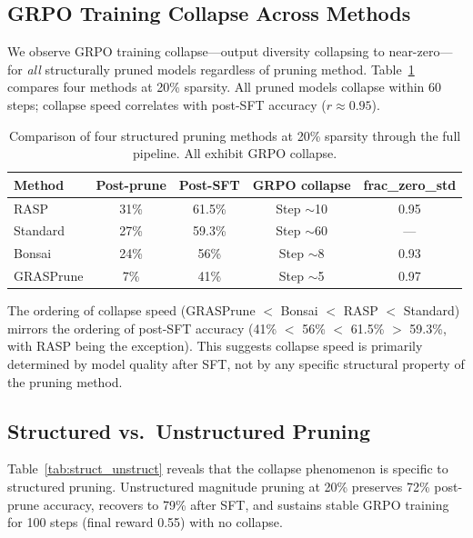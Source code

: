 \documentclass[11pt,a4paper]{article}
\begin{document}
\subsection{GRPO Training Collapse Across Methods}
\label{sec:collapse}

We observe GRPO training collapse---output diversity collapsing to near-zero---for \emph{all} structurally pruned models regardless of pruning method. Table~\ref{tab:methods} compares four methods at 20\% sparsity. All pruned models collapse within 60 steps; collapse speed correlates with post-SFT accuracy ($r \approx 0.95$).

\begin{table}[t]
\centering
\small
\caption{Comparison of four structured pruning methods at 20\% sparsity through the full pipeline. All exhibit GRPO collapse.}
\label{tab:methods}
\begin{tabular}{lcccc}
\toprule
\textbf{Method} & \textbf{Post-prune} & \textbf{Post-SFT} & \textbf{GRPO collapse} & \textbf{frac\_zero\_std} \\
\midrule
RASP & 31\% & 61.5\% & Step $\sim$10 & 0.95 \\
Standard & 27\% & 59.3\% & Step $\sim$60 & --- \\
Bonsai & 24\% & 56\% & Step $\sim$8 & 0.93 \\
GRASPrune & 7\% & 41\% & Step $\sim$5 & 0.97 \\
\bottomrule
\end{tabular}
\end{table}

The ordering of collapse speed (GRASPrune $<$ Bonsai $<$ RASP $<$ Standard) mirrors the ordering of post-SFT accuracy (41\% $<$ 56\% $<$ 61.5\% $>$ 59.3\%, with RASP being the exception). This suggests collapse speed is primarily determined by model quality after SFT, not by any specific structural property of the pruning method.

\subsection{Structured vs.\ Unstructured Pruning}
\label{sec:struct_vs_unstruct}

Table~\ref{tab:struct_unstruct} reveals that the collapse phenomenon is specific to structured pruning. Unstructured magnitude pruning at 20\% preserves 72\% post-prune accuracy, recovers to 79\% after SFT, and sustains stable GRPO training for 100 steps (final reward 0.55) with no collapse.
\end{document}

